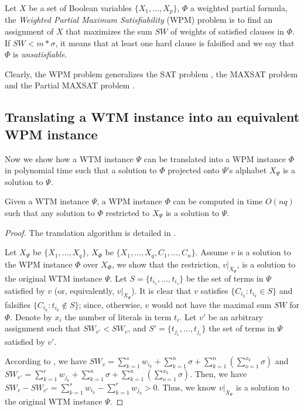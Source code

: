 \begin{definition}
	Let $X$ be a set of Boolean variables $\{X_1, \ldots, X_p\}$, 
	$\Phi$ a weighted partial formula,
  the \textit{Weighted Partial Maximum Satisfiability} (WPM) problem 
	is to find an assignment of $X$ that 
	maximizes the sum $SW$ of
	weights of satisfied clauses in $\Phi$.
	If $SW < m*\sigma$, it means that at least one hard clause is falsified
	and we say that $\Phi$ is \textit{unsatisfiable}.
\end{definition}

Clearly, the WPM problem generalizes the SAT problem \cite{Garey:1979}, the MAXSAT 
problem \cite{cohen2004complete} and the Partial MAXSAT problem \cite{cohen2004complete}.


\subsection{Translating a WTM instance into an equivalent WPM instance}
Now we show how a WTM instance $\Psi$ can be translated into a WPM instance $\Phi$ 
in polynomial time such that a solution to $\Phi$ projected onto $\Psi$'s 
alphabet $X_\Psi$ is a solution to $\Psi$.
\begin{thm}
\label{thm:wtm_wpm}
	Given a WTM instance $\Psi$, a WPM instance $\Phi$ can be computed	in time 
	$O(nq)$ such that any solution to $\Phi$ restricted to $X_\Psi$ is a solution
	to $\Psi$.
\end{thm}
\begin{proof}
The translation algorithm is detailed in .

Let $X_\Psi$ be $\{X_1,\ldots,X_q\}$,
$X_\Phi$ be $\{X_1,\ldots,X_q,C_1,\ldots,C_n\}$.
Assume $v$ is a solution to the WPM instance $\Phi$ over $X_\Phi$, we show that
the restriction, $v|_{X_\Psi}$, is a solution to the original WTM instance $\Psi$.
Let $S=\{t_{i_1}, \ldots, t_{i_s}\}$ be the set of terms in $\Psi$ satisfied by $v$
(or, equivalently, $v|_{X_\Psi}$).
It is clear that $v$ satisfies $\{C_{i_k}:t_{i_k} \in S\}$ and falsifies
$\{C_{i_k}:t_{i_k} \not \in S\}$; since, otherwise,
$v$ would not have the maximal sum $\mathit{SW}$ for $\Phi$.
Denote by $x_i$ the number of literals in term $t_i$.
Let $v'$ be an arbitrary assignment such that $\mathit{SW}_{v'} < \mathit{SW}_v$,
and $S'=\{t_{j_1}, \ldots, t_{j_r}\}$ the set of terms in $\Psi$ satisfied by $v'$.

According to , we have
$\mathit{SW}_v=\sum_{k=1}^{s} w_{i_k}+\sum^n_{k=1} \sigma+\sum^n_{k=1}(\sum^{x_k}_{o=1} \sigma)$
and
$\mathit{SW}_{v'}=\sum^r_{k=1} w_{j_k}+\sum^n_{k=1} \sigma+\sum^n_{k=1}(\sum^{x_k}_{o=1} \sigma)$.  
Then, we have $\mathit{SW}_v-\mathit{SW}_{v'}=\sum_{k=1}^{s} w_{i_k} - \sum^r_{k=1} w_{j_k}>0$.
Thus, we know $v|_{X_\Psi}$ is a solution to the original WTM instance $\Psi$.
\end{proof}

